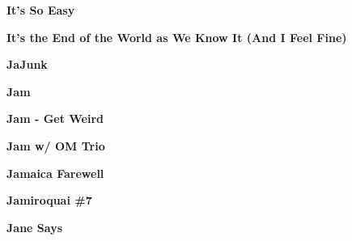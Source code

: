 \newline
\vspace{10pt} 
\begin{center}\textbf{It's So Easy}\end{center}
\newline
\vspace{10pt} 
\begin{center}\textbf{It's the End of the World as We Know It (And I Feel Fine)}\end{center}
\newline
\vspace{10pt} 
\begin{center}\textbf{JaJunk}\end{center}
\newline
\vspace{10pt} 
\begin{center}\textbf{Jam}\end{center}
\newline
\vspace{10pt} 
\begin{center}\textbf{Jam - Get Weird}\end{center}
\newline
\vspace{10pt} 
\begin{center}\textbf{Jam w/ OM Trio}\end{center}
\newline
\vspace{10pt} 
\begin{center}\textbf{Jamaica Farewell}\end{center}
\newline
\vspace{10pt} 
\begin{center}\textbf{Jamiroquai \#7}\end{center}
\newline
\vspace{10pt} 
\begin{center}\textbf{Jane Says}\end{center}
\newline
